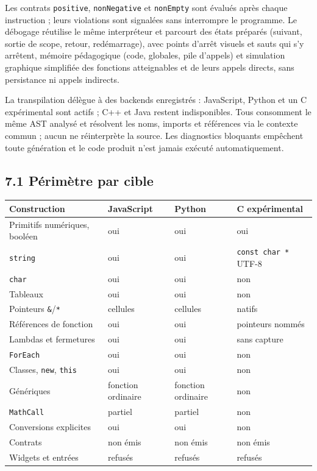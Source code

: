 \documentclass[11pt,a4paper]{article}
\newcommand{\code}[1]{\texttt{#1}}
\begin{document}
Les contrats \code{positive}, \code{nonNegative} et \code{nonEmpty} sont
évalués après chaque instruction ; leurs violations sont signalées sans
interrompre le programme. Le débogage réutilise le même interpréteur et
parcourt des états préparés (suivant, sortie de scope, retour, redémarrage),
avec points d'arrêt visuels et sauts qui s'y arrêtent, mémoire pédagogique
(code, globales, pile d'appels) et simulation graphique simplifiée des fonctions
atteignables et de leurs appels directs, sans persistance ni appels indirects.

La transpilation délègue à des backends enregistrés : JavaScript, Python et un C expérimental sont actifs ; C++ et Java restent indisponibles. Tous consomment le même AST analysé et résolvent les noms, imports et références via le contexte commun ; aucun ne réinterprète la source. Les diagnostics bloquants empêchent toute génération et le code produit n'est jamais exécuté automatiquement.

\subsection*{7.1 Périmètre par cible}
\begin{center}
\small
\begin{tabular}{@{}p{48mm}p{31mm}p{31mm}p{40mm}@{}}
\textbf{Construction} & \textbf{JavaScript} & \textbf{Python} & \textbf{C expérimental}\\
\hline
Primitifs numériques, booléen & oui & oui & oui\\
\code{string} & oui & oui & \code{const char *} UTF-8\\
\code{char} & oui & oui & non\\
Tableaux & oui & oui & non\\
Pointeurs \code{\&}/\code{*} & cellules & cellules & natifs\\
Références de fonction & oui & oui & pointeurs nommés\\
Lambdas et fermetures & oui & oui & sans capture\\
\code{ForEach} & oui & oui & non\\
Classes, \code{new}, \code{this} & oui & oui & non\\
Génériques & fonction ordinaire & fonction ordinaire & non\\
\code{MathCall} & partiel & partiel & non\\
Conversions explicites & oui & oui & non\\
Contrats & non émis & non émis & non émis\\
Widgets et entrées & refusés & refusés & refusés\\
\end{tabular}
\end{center}
\end{document}
